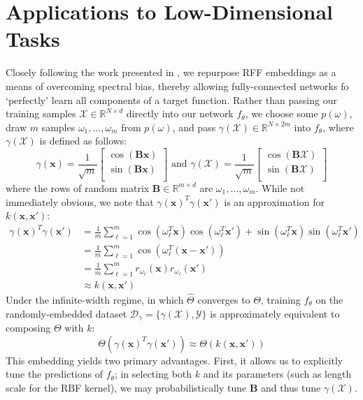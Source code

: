 \documentclass[11pt]{article}
\newcommand{\R}{\mathbb{R}}
\newcommand{\X}{\mathcal{X}}
\newcommand{\Y}{\mathcal{Y}}
\begin{document}
\section{Applications to Low-Dimensional Tasks}
Closely following the work presented in \cite{Tancik20}, we repurpose RFF embeddings as a means of overcoming spectral bias, thereby  allowing fully-connected networks fo `perfectly' learn all components of a target function. Rather than passing our training samples $\X \in \R^{N \times d}$ directly into our network $f_\theta$, we choose some $p(\omega)$, draw $m$ samples $\omega_1, \dots, \omega_m$ from $p(\omega)$, and pass $\gamma(\X) \in \R^{N \times 2m}$ into $f_\theta$, where $\gamma(\X)$ is defined as follows:
$$\gamma(\mathbf{x}) = \frac{1}{\sqrt{m}}\begin{bmatrix}
    \cos(\mathbf{B}\mathbf{x})\\
    \sin(\mathbf{B}\mathbf{x})\\
\end{bmatrix} \text{  and  }
\gamma(\X) = \frac{1}{\sqrt{m}}\begin{bmatrix}
    \cos(\mathbf{B}\X)\\
    \sin(\mathbf{B}\X)\\
\end{bmatrix}$$
where the rows of random matrix $\mathbf{B} \in \R^{m \times d}$ are $\omega_1, \dots, \omega_m$. While not immediately obvious, we note that $\gamma(\mathbf{x})^T\gamma(\mathbf{x}')$ is an approximation for $k(\mathbf{x}, \mathbf{x}')$:
\begin{align*}
    \gamma(\mathbf{x})^T\gamma(\mathbf{x}')  &= \frac1m \sum_{\ell = 1}^m \cos(\omega_\ell^T\mathbf{x})\cos(\omega_\ell^T\mathbf{x}') + \sin(\omega_\ell^T\mathbf{x})\sin(\omega_\ell^T\mathbf{x}')\\
    &= \frac1m\sum_{\ell = 1}^m \cos(\omega_\ell^T(\mathbf{x} - \mathbf{x}'))\\ 
    &= \frac1m\sum_{\ell = 1}^m r_{\omega_\ell}(\mathbf{x})r_{\omega_\ell}(\mathbf{x}')\\\ 
    &\approx k(\mathbf{x}, \mathbf{x}')
\end{align*}
Under the infinite-width regime, in which $\hat{\Theta}$ converges to $\Theta$, training $f_\theta$ on the randomly-embedded dataset $\mathcal{D}_\gamma = \{\gamma(\X), \Y\}$ is approximately equivalent to composing $\Theta$ with $k$:
$$\Theta(\gamma(\mathbf{x})^T\gamma(\mathbf{x}')) \approx \Theta(k(\mathbf{x}, \mathbf{x}'))$$
This embedding yields two primary advantages. First, it allows us to explicitly tune the predictions of $f_\theta$; in selecting both $k$ and its parameters (such as length scale for the RBF kernel), we may probabilistically tune $\mathbf{B}$ and thus tune $\gamma(\X)$.\\ 
\end{document}
